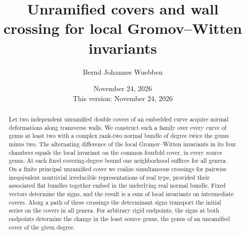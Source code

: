 \documentclass[11pt]{amsart}
\title[Unramified covers and wall crossing]{Unramified covers and wall crossing for local Gromov--Witten invariants}
\author{Bernd Johannes Wuebben}
\date{November 24, 2026\\This version: November 24, 2026}
\theoremstyle{definition}
\theoremstyle{remark}\newtheorem{remark}[theorem]{Remark}
\begin{document}
\begin{abstract}
Let two independent unramified double covers of an embedded curve acquire
normal deformations along transverse walls. We construct such a family
over every curve of genus at least two with a complex rank-two normal
bundle of degree twice the genus minus two. The alternating difference of
the local Gromov--Witten invariants in its four chambers equals the local
invariant on the common fourfold cover, in every source genus.
At each fixed covering-degree bound one neighborhood suffices for all genera.
On a finite principal unramified cover we realize simultaneous crossings
for pairwise inequivalent nontrivial irreducible representations of real
type, provided their associated flat bundles together embed in the
underlying real normal bundle. Fixed vectors determine the signs, and the
result is a sum of local invariants on intermediate covers. Along a path
of these crossings the determinant signs transport the initial series on
the covers in all genera. For arbitrary rigid endpoints, the signs at
both endpoints determine the change in the least source genus, the genus
of an unramified cover of the given degree.
\end{abstract}
\maketitle
\setcounter{tocdepth}{1}
\newpage
\tableofcontents
\newpage
















\appendix







\end{document}
